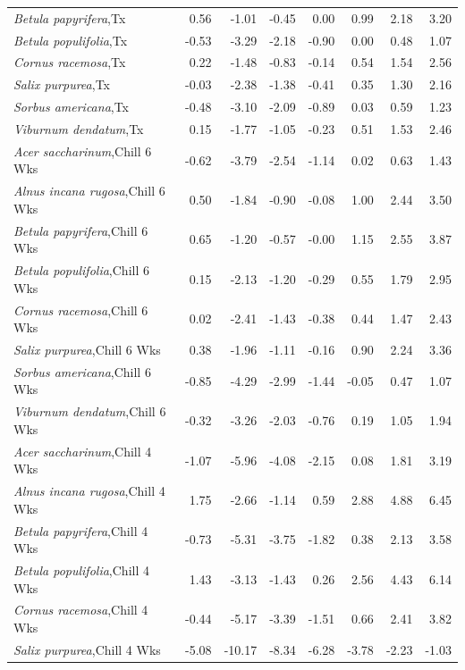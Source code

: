 \documentclass{article}\usepackage[]{graphicx}\usepackage[]{color}
\begin{document}
\begin{longtable}{lrrrrrrr}
  \textit{Betula papyrifera},Tx & 0.56 & -1.01 & -0.45 & 0.00 & 0.99 & 2.18 & 3.20 \\ 
  \textit{Betula populifolia},Tx & -0.53 & -3.29 & -2.18 & -0.90 & 0.00 & 0.48 & 1.07 \\ 
  \textit{Cornus racemosa},Tx & 0.22 & -1.48 & -0.83 & -0.14 & 0.54 & 1.54 & 2.56 \\ 
  \textit{Salix purpurea},Tx & -0.03 & -2.38 & -1.38 & -0.41 & 0.35 & 1.30 & 2.16 \\ 
  \textit{Sorbus americana},Tx & -0.48 & -3.10 & -2.09 & -0.89 & 0.03 & 0.59 & 1.23 \\ 
  \textit{Viburnum dendatum},Tx & 0.15 & -1.77 & -1.05 & -0.23 & 0.51 & 1.53 & 2.46 \\ 
  \textit{Acer saccharinum},Chill 6 Wks & -0.62 & -3.79 & -2.54 & -1.14 & 0.02 & 0.63 & 1.43 \\ 
  \textit{Alnus incana rugosa},Chill 6 Wks & 0.50 & -1.84 & -0.90 & -0.08 & 1.00 & 2.44 & 3.50 \\ 
  \textit{Betula papyrifera},Chill 6 Wks & 0.65 & -1.20 & -0.57 & -0.00 & 1.15 & 2.55 & 3.87 \\ 
  \textit{Betula populifolia},Chill 6 Wks & 0.15 & -2.13 & -1.20 & -0.29 & 0.55 & 1.79 & 2.95 \\ 
  \textit{Cornus racemosa},Chill 6 Wks & 0.02 & -2.41 & -1.43 & -0.38 & 0.44 & 1.47 & 2.43 \\ 
  \textit{Salix purpurea},Chill 6 Wks & 0.38 & -1.96 & -1.11 & -0.16 & 0.90 & 2.24 & 3.36 \\ 
  \textit{Sorbus americana},Chill 6 Wks & -0.85 & -4.29 & -2.99 & -1.44 & -0.05 & 0.47 & 1.07 \\ 
  \textit{Viburnum dendatum},Chill 6 Wks & -0.32 & -3.26 & -2.03 & -0.76 & 0.19 & 1.05 & 1.94 \\ 
  \textit{Acer saccharinum},Chill 4 Wks & -1.07 & -5.96 & -4.08 & -2.15 & 0.08 & 1.81 & 3.19 \\ 
  \textit{Alnus incana rugosa},Chill 4 Wks & 1.75 & -2.66 & -1.14 & 0.59 & 2.88 & 4.88 & 6.45 \\ 
  \textit{Betula papyrifera},Chill 4 Wks & -0.73 & -5.31 & -3.75 & -1.82 & 0.38 & 2.13 & 3.58 \\ 
  \textit{Betula populifolia},Chill 4 Wks & 1.43 & -3.13 & -1.43 & 0.26 & 2.56 & 4.43 & 6.14 \\ 
  \textit{Cornus racemosa},Chill 4 Wks & -0.44 & -5.17 & -3.39 & -1.51 & 0.66 & 2.41 & 3.82 \\ 
  \textit{Salix purpurea},Chill 4 Wks & -5.08 & -10.17 & -8.34 & -6.28 & -3.78 & -2.23 & -1.03 \\ 

\end{longtable}
\end{document}
